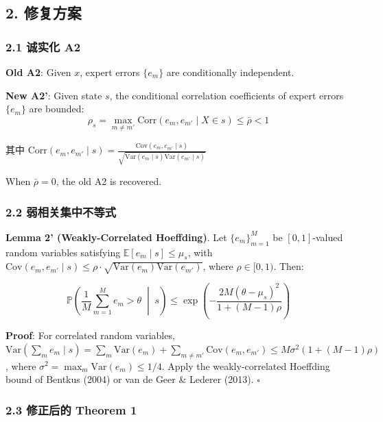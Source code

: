 \documentclass[
  12pt,
]{ctexart}
\begin{document}
\subsection{2. 修复方案}\label{ux4feeux590dux65b9ux6848}

\subsubsection{2.1 诚实化 A2}\label{ux8bdaux5b9eux5316-a2}

\textbf{Old A2}: Given \(x\), expert errors \(\{e_m\}\) are conditionally independent.

\textbf{New A2'}: Given state \(s\), the conditional correlation coefficients of expert errors \(\{e_m\}\)
are bounded:
\[\rho_s = \max_{m \neq m'} \text{Corr}(e_m, e_{m'} \mid X \in s) \leq \bar{\rho} < 1\]

其中
\(\text{Corr}(e_m, e_{m'} \mid s) = \frac{\text{Cov}(e_m, e_{m'} \mid s)}{\sqrt{\text{Var}(e_m \mid s) \text{Var}(e_{m'} \mid s)}}\)

When \(\bar{\rho} = 0\), the old A2 is recovered.

\subsubsection{2.2
弱相关集中不等式}\label{ux5f31ux76f8ux5173ux96c6ux4e2dux4e0dux7b49ux5f0f}

\textbf{Lemma 2' (Weakly-Correlated Hoeffding)}. Let \(\{e_m\}_{m=1}^M\) be
\([0,1]\)-valued random variables satisfying \(\mathbb{E}[e_m \mid s] \leq \mu_s\), with
\(\text{Cov}(e_m, e_{m'} \mid s) \leq \rho \cdot \sqrt{\text{Var}(e_m) \text{Var}(e_{m'})}\), where
\(\rho \in [0, 1)\). Then:

\[\mathbb{P}\left(\frac{1}{M}\sum_{m=1}^M e_m > \theta \;\middle|\; s\right) \leq \exp\left(-\frac{2M(\theta - \mu_s)^2}{1 + (M-1)\rho}\right)\]

\textbf{Proof}:
For correlated random variables, \(\text{Var}(\sum_m e_m \mid s) = \sum_m \text{Var}(e_m) + \sum_{m \neq m'} \text{Cov}(e_m, e_{m'}) \leq M\sigma^2(1 + (M-1)\rho)\), where
\(\sigma^2 = \max_m \text{Var}(e_m) \leq 1/4\). Apply the weakly-correlated Hoeffding bound of Bentkus (2004) or
van de Geer \& Lederer (2013). \(\square\)

\subsubsection{2.3 修正后的 Theorem
1}\label{ux4feeux6b63ux540eux7684-theorem-1}
\end{document}

